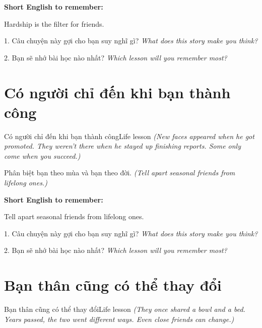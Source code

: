 \begin{ghinhoanh}
\textbf{Short English to remember:}

Hardship is the filter for friends.

\end{ghinhoanh}

\begin{tuhocnhanh}
1. Câu chuyện này gợi cho bạn suy nghĩ gì? \textit{What does this story make you think?}

2. Bạn sẽ nhớ bài học nào nhất? \textit{Which lesson will you remember most?}
\end{tuhocnhanh}
\ngancach


\section{Có người chỉ đến khi bạn thành công}
\begin{truyen}{Có người chỉ đến khi bạn thành công}{Life lesson}
\textit{(New faces appeared when he got promoted. They weren't there when he stayed up finishing reports. Some only come when you succeed.)}
\end{truyen}

\begin{baihoc}
Phân biệt bạn theo mùa và bạn theo đời.
\textit{(Tell apart seasonal friends from lifelong ones.)}
\end{baihoc}

\begin{ghinhoanh}
\textbf{Short English to remember:}

Tell apart seasonal friends from lifelong ones.

\end{ghinhoanh}

\begin{tuhocnhanh}
1. Câu chuyện này gợi cho bạn suy nghĩ gì? \textit{What does this story make you think?}

2. Bạn sẽ nhớ bài học nào nhất? \textit{Which lesson will you remember most?}
\end{tuhocnhanh}
\ngancach


\section{Bạn thân cũng có thể thay đổi}
\begin{truyen}{Bạn thân cũng có thể thay đổi}{Life lesson}
\textit{(They once shared a bowl and a bed. Years passed, the two went different ways. Even close friends can change.)}
\end{truyen}

